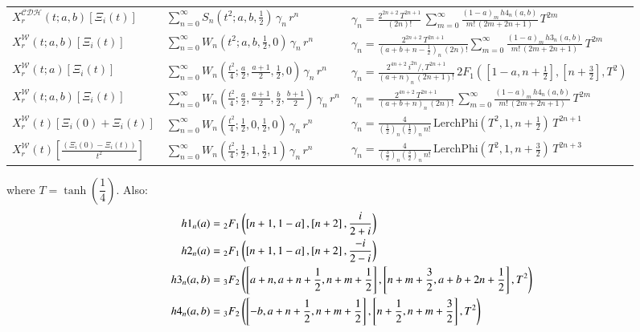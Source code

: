 \documentclass[a4paper,11pt,twoside]{amsart}
\newcommand\LerchPhi{\mathrm{LerchPhi}}
\newcommand{\defeq}{=}
\newcommand{\defeq}{\stackrel{\scriptscriptstyle \textnormal{def}}{=}}
\begin{document}
\begin{footnotesize}
\begin{table}[H]
\begin{center}
\begin{tabular}{|l|l|l|}
      $X^\mathcal{CDH}_r(t;a,b)\left[\Xi_i(t)\right]$ & $\displaystyle \sum_{n=0}^\infty S_{n}\left(t^2;a,b,\frac12\right)\,\gamma_n\,r^{n}$  &$\displaystyle\gamma_n=\frac{2^{2n+2}\,T^{2n+1}}{(2n)!}\,\sum_{m=0}^{\infty} \frac{(1-a)_m\,h4_n(a,b)}{m!\,(2m+2n+1)}\,T^{2m}$ \\
      $X^\mathcal{W}_r(t;a,b)\left[\Xi_i(t)\right]$ & $\displaystyle \sum_{n=0}^\infty W_n\left(t^2;a,b,\frac12,0\right)\,\gamma_n\,r^n$  &$\displaystyle\gamma_n=\frac{2^{2n+2}\,T^{2n+1}}{\left(a+b+n-\frac12\right)_{n}\,(2n)!} \sum_{m=0}^{\infty} \frac{(1-a)_m\,h3_n(a,b)}{m!\,(2m+2n+1)}\,T^{2m}$ \\ 
      $X^\mathcal{W}_r(t;a)\left[\Xi_i(t)\right]$ & $\displaystyle \sum_{n=0}^\infty W_{n}\left(\frac{t^2}{4};\frac{a}{2},\frac{a+1}{2},\frac12,0\right)\,\gamma_n\,r^{n}$  &$\displaystyle\gamma_n=\frac{2^{4n+2}\,i^{2n}/,T^{2n+1}}{\left(a+n\right)_{n}\,(2n+1)!}\,2F_1\left(\left[1-a, n+\frac12\right],\left[n+\frac32\right],T^2\right)$ \\  
      $X^\mathcal{W}_r(t;a,b)\left[\Xi_i(t)\right]$ & $\displaystyle \sum_{n=0}^\infty W_{n}\left(\frac{t^2}{4};\frac{a}{2},\frac{a+1}{2},\frac{b}{2},\frac{b+1}{2}\right)\,\gamma_n\,r^{n}$  &$\displaystyle\gamma_n=\frac{2^{4n+2}\,T^{2n+1}}{\left(a+b+n\right)_n\,(2n)!}\,\sum_{m=0}^{\infty} \frac{(1-a)_m\,h4_n(a,b)}{m!\,(2m+2n+1)}\,T^{2m}$ \\  
      $X^\mathcal{W}_r(t)\left[\Xi_i(0)+\Xi_i(t)\right]$ & $\displaystyle \sum_{n=0}^\infty W_n\left(\frac{t^2}{4};\frac12,0,\frac12,0\right)\,\gamma_n\,r^n$  &$\displaystyle\gamma_n=\frac{4}{\left(\frac12\right)_n\left(\frac12\right)_n\,n!}\,\LerchPhi\left(T^2,1,n+\frac12\right)\,T^{2n+1}$ \\  
      $X^\mathcal{W}_r(t)\left[\frac{(\Xi_i(0)-\Xi_i(t))}{t^2}\right]$ & $\displaystyle \sum_{n=0}^\infty W_n\left(\frac{t^2}{4};\frac12,1,\frac12,1\right)\,\gamma_n\,r^n$  &$\displaystyle\gamma_n=\frac{4}{\left(\frac32\right)_n\left(\frac32\right)_n\,n!}\,\LerchPhi\left(T^2,1,n+\frac32\right)\,T^{2n+3}$ \\        
    \end{tabular}
  \end{center}
\end{table}
where $T = \tanh\left(\dfrac{1}{4}\right)$. Also:
\begin{align}
 h1_n(a) &\defeq {}_2F_1\left(\left[n+1, 1-a\right],\left[n+2\right],\frac{i}{2+i}\right) \notag \\
 h2_n(a) &\defeq {}_2F_1\left(\left[n+1, 1-a\right],\left[n+2\right],\frac{-i}{2-i}\right) \notag \\
 h3_n(a,b) &\defeq {}_3F_2\left(\left[a+n, a+n+\frac12,n+m+\frac12\right],\left[n+m+\frac32,a+b+2n+\frac12\right],T^2\right) \notag \\
 h4_n(a,b) &\defeq {}_3F_2\left(\left[-b, a+n+\frac12,n+m+\frac12\right],\left[n+\frac12,n+m+\frac32\right],T^2\right) \notag \notag
\end{align} 
\end{footnotesize}
\end{document}

